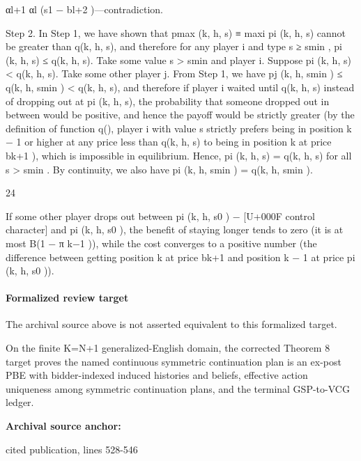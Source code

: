 \documentclass[10pt]{article}
\begin{document}
\begin{ReviewVerbatim}
αl+1
αl (s1 − bl+2 )—contradiction.

Step 2. In Step 1, we have shown that pmax (k, h, s) ≡ maxi pi (k, h, s) cannot be greater than
q(k, h, s), and therefore for any player i and type s ≥ smin , pi (k, h, s) ≤ q(k, h, s). Take some value
s > smin and player i. Suppose pi (k, h, s) < q(k, h, s). Take some other player j. From Step 1,
we have pj (k, h, smin ) ≤ q(k, h, smin ) < q(k, h, s), and therefore if player i waited until q(k, h, s)
instead of dropping out at pi (k, h, s), the probability that someone dropped out in between would
be positive, and hence the payoff would be strictly greater (by the definition of function q(), player
i with value s strictly prefers being in position k − 1 or higher at any price less than q(k, h, s) to
being in position k at price bk+1 ), which is impossible in equilibrium. Hence, pi (k, h, s) = q(k, h, s)
for all s > smin . By continuity, we also have pi (k, h, smin ) = q(k, h, smin ).

24

If some other player drops out between pi (k, h, s0 ) − [U+000F control character] and pi (k, h, s0 ), the benefit of staying longer tends to zero
(it is at most B(1 − π k−1 )), while the cost converges to a positive number (the difference between getting position k
at price bk+1 and position k − 1 at price pi (k, h, s0 )).
\end{ReviewVerbatim}


\paragraph{Formalized review target}
The archival source above is not asserted equivalent to this formalized target.
\begin{ReviewVerbatim}
On the finite K=N+1 generalized-English domain, the corrected Theorem 8 target proves the named continuous symmetric continuation plan is an ex-post PBE with bidder-indexed induced histories and beliefs, effective action uniqueness among symmetric continuation plans, and the terminal GSP-to-VCG ledger.
\end{ReviewVerbatim}

\textbf{Archival source anchor:} {\footnotesize\raggedright cited publication, lines 528-\allowbreak{}546\par}
\end{document}
